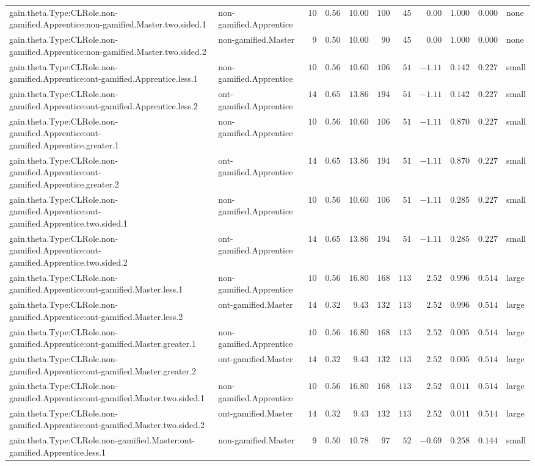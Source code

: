 \documentclass[6pt]{article}
\begin{document}
\begin{landscape}
{\begin{longtable}{llrrrrrrrrl}
gain.theta.Type:CLRole.non-gamified.Apprentice:non-gamified.Master.two.sided.1&non-gamified.Apprentice&$10$&$0.56$&$10.00$&$100$&$ 45$&$ 0.00$&$1.000$&$0.000$&none\tabularnewline
gain.theta.Type:CLRole.non-gamified.Apprentice:non-gamified.Master.two.sided.2&non-gamified.Master&$ 9$&$0.50$&$10.00$&$ 90$&$ 45$&$ 0.00$&$1.000$&$0.000$&none\tabularnewline
gain.theta.Type:CLRole.non-gamified.Apprentice:ont-gamified.Apprentice.less.1&non-gamified.Apprentice&$10$&$0.56$&$10.60$&$106$&$ 51$&$-1.11$&$0.142$&$0.227$&small\tabularnewline
gain.theta.Type:CLRole.non-gamified.Apprentice:ont-gamified.Apprentice.less.2&ont-gamified.Apprentice&$14$&$0.65$&$13.86$&$194$&$ 51$&$-1.11$&$0.142$&$0.227$&small\tabularnewline
gain.theta.Type:CLRole.non-gamified.Apprentice:ont-gamified.Apprentice.greater.1&non-gamified.Apprentice&$10$&$0.56$&$10.60$&$106$&$ 51$&$-1.11$&$0.870$&$0.227$&small\tabularnewline
gain.theta.Type:CLRole.non-gamified.Apprentice:ont-gamified.Apprentice.greater.2&ont-gamified.Apprentice&$14$&$0.65$&$13.86$&$194$&$ 51$&$-1.11$&$0.870$&$0.227$&small\tabularnewline
gain.theta.Type:CLRole.non-gamified.Apprentice:ont-gamified.Apprentice.two.sided.1&non-gamified.Apprentice&$10$&$0.56$&$10.60$&$106$&$ 51$&$-1.11$&$0.285$&$0.227$&small\tabularnewline
gain.theta.Type:CLRole.non-gamified.Apprentice:ont-gamified.Apprentice.two.sided.2&ont-gamified.Apprentice&$14$&$0.65$&$13.86$&$194$&$ 51$&$-1.11$&$0.285$&$0.227$&small\tabularnewline
gain.theta.Type:CLRole.non-gamified.Apprentice:ont-gamified.Master.less.1&non-gamified.Apprentice&$10$&$0.56$&$16.80$&$168$&$113$&$ 2.52$&$0.996$&$0.514$&large\tabularnewline
gain.theta.Type:CLRole.non-gamified.Apprentice:ont-gamified.Master.less.2&ont-gamified.Master&$14$&$0.32$&$ 9.43$&$132$&$113$&$ 2.52$&$0.996$&$0.514$&large\tabularnewline
gain.theta.Type:CLRole.non-gamified.Apprentice:ont-gamified.Master.greater.1&non-gamified.Apprentice&$10$&$0.56$&$16.80$&$168$&$113$&$ 2.52$&$0.005$&$0.514$&large\tabularnewline
gain.theta.Type:CLRole.non-gamified.Apprentice:ont-gamified.Master.greater.2&ont-gamified.Master&$14$&$0.32$&$ 9.43$&$132$&$113$&$ 2.52$&$0.005$&$0.514$&large\tabularnewline
gain.theta.Type:CLRole.non-gamified.Apprentice:ont-gamified.Master.two.sided.1&non-gamified.Apprentice&$10$&$0.56$&$16.80$&$168$&$113$&$ 2.52$&$0.011$&$0.514$&large\tabularnewline
gain.theta.Type:CLRole.non-gamified.Apprentice:ont-gamified.Master.two.sided.2&ont-gamified.Master&$14$&$0.32$&$ 9.43$&$132$&$113$&$ 2.52$&$0.011$&$0.514$&large\tabularnewline
gain.theta.Type:CLRole.non-gamified.Master:ont-gamified.Apprentice.less.1&non-gamified.Master&$ 9$&$0.50$&$10.78$&$ 97$&$ 52$&$-0.69$&$0.258$&$0.144$&small\tabularnewline

\end{longtable}}
\end{landscape}
\end{document}
